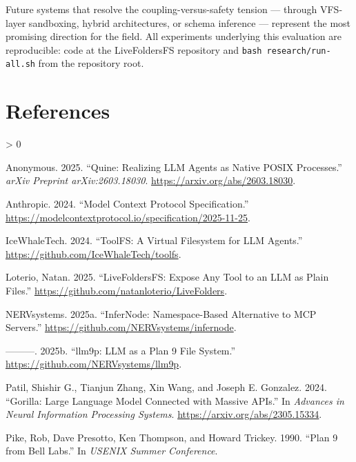 \documentclass[
  11pt,
]{article}
\newlength{\cslhangindent}
\newenvironment{CSLReferences}[2] %
 {%
  \setlength{\parindent}{0pt}
  \ifodd #1 \everypar{\setlength{\hangindent}{\cslhangindent}}\ignorespaces\fi
  \ifnum #2 > 0
  \setlength{\parskip}{#2\baselineskip}
  \fi
 }%
 {}
\begin{document}
Future systems that resolve the coupling-versus-safety tension ---
through VFS-layer sandboxing, hybrid architectures, or schema inference
--- represent the most promising direction for the field. All
experiments underlying this evaluation are reproducible: code at the
LiveFoldersFS repository and \texttt{bash\ research/run-all.sh} from the
repository root.

\hypertarget{references}{%
\section*{References}\label{references}}

\hypertarget{refs}{}
\begin{CSLReferences}{1}{0}
\leavevmode{}%
Anonymous. 2025. {``Quine: Realizing {LLM} Agents as Native {POSIX}
Processes.''} \emph{arXiv Preprint arXiv:2603.18030}.
\url{https://arxiv.org/abs/2603.18030}.

\leavevmode{}%
Anthropic. 2024. {``Model Context Protocol Specification.''}
\url{https://modelcontextprotocol.io/specification/2025-11-25}.

\leavevmode{}%
IceWhaleTech. 2024. {``{ToolFS}: A Virtual Filesystem for {LLM}
Agents.''} \url{https://github.com/IceWhaleTech/toolfs}.

\leavevmode{}%
Loterio, Natan. 2025. {``{LiveFoldersFS}: Expose Any Tool to an {LLM} as
Plain Files.''} \url{https://github.com/natanloterio/LiveFolders}.

\leavevmode{}%
NERVsystems. 2025a. {``{InferNode}: Namespace-Based Alternative to {MCP}
Servers.''} \url{https://github.com/NERVsystems/infernode}.

\leavevmode{}%
---------. 2025b. {``{llm9p}: {LLM} as a Plan 9 File System.''}
\url{https://github.com/NERVsystems/llm9p}.

\leavevmode{}%
Patil, Shishir G., Tianjun Zhang, Xin Wang, and Joseph E. Gonzalez.
2024. {``Gorilla: Large Language Model Connected with Massive {APIs}.''}
In \emph{Advances in Neural Information Processing Systems}.
\url{https://arxiv.org/abs/2305.15334}.

\leavevmode{}%
Pike, Rob, Dave Presotto, Ken Thompson, and Howard Trickey. 1990.
{``Plan 9 from {Bell Labs}.''} In \emph{USENIX Summer Conference}.


\end{CSLReferences}
\end{document}
